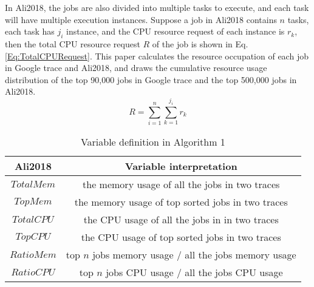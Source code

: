 \documentclass[conference]{IEEEtran}
\begin{document}
In Ali2018, the jobs are also divided into multiple tasks to execute, and each task will have multiple execution instances. Suppose a job in Ali2018 contains $n$ tasks, each task has $j_i$ instance, and the CPU resource request of each instance is $r_k$, then the total CPU resource request $R$ of the job is shown in Eq. \ref{Eq:TotalCPURequest}.
This paper calculates the resource occupation of each job in Google trace and Ali2018, and draws the cumulative resource usage distribution of the top 90,000 jobs in Google trace and the top 500,000 jobs in Ali2018.
\begin{equation} \label{Eq:TotalCPURequest}
     R = \sum\limits_{i = 1}^n {\sum\limits_{k = 1}^{{j_i}} {{r_k}} }
\end{equation}
\begin{table}[htbp]
\centering
\caption{Variable definition in Algorithm 1}
\begin{tabular}{|c|c|}
\hline
Ali2018  & Variable interpretation
\\ \hline
$TotalMem$ & the memory usage of all the jobs in two traces                           \\ \hline
$TopMem$    & the memory usage of top sorted jobs in two traces                        \\ \hline
$TotalCPU$  & the CPU usage of all the jobs in in two traces                             \\ \hline
$TopCPU$    & the CPU usage of top sorted jobs in two traces                          \\ \hline
$RatioMem$  & top $n$ jobs memory usage / all the jobs memory usage\\ \hline
$RatioCPU$ & top $n$ jobs CPU usage / all the jobs CPU usage    \\ \hline
\end{tabular}
\label{Table:Vardefine}
\end{table}
\end{document}
